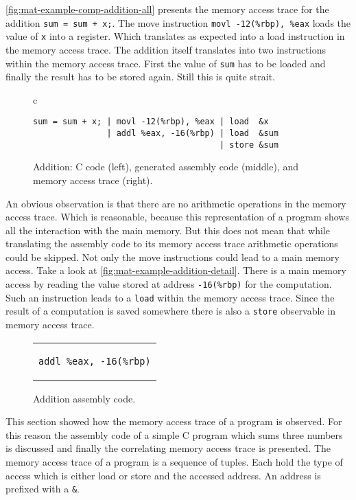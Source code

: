\documentclass[onecolumn, openany, master, english, seal, signatures]{dbrgrptt}
\begin{document}
\autoref{fig:mat-example-comp-addition-all} presents the memory access trace for the addition \texttt{sum = sum + x;}. The move instruction \texttt{movl -12(\%rbp), \%eax} loads the value of \texttt{x} into a register. Which translates as expected into a load instruction in the memory access trace. The addition itself translates into two instructions within the memory access trace. First the value of \texttt{sum} has to be loaded and finally the result has to be stored again. Still this is quite strait.

\begin{figure}[h!]
  \centering
  \begin{tabular}{c}
  \begin{lstlisting}
sum = sum + x; | movl -12(%rbp), %eax | load  &x
               | addl %eax, -16(%rbp) | load  &sum
                                      | store &sum
  \end{lstlisting}
  \end{tabular}
  \caption{Addition: C code (left), generated assembly code (middle), and memory access trace (right).}
  \label{fig:mat-example-comp-addition-all}
\end{figure}

An obvious observation is that there are no arithmetic operations in the memory access trace. Which is reasonable, because this representation of a program shows all the interaction with the main memory. But this does not mean that while translating the assembly code to its memory access trace arithmetic operations could be skipped. Not only the move instructions could lead to a main memory access. Take a look at \autoref{fig:mat-example-addition-detail}. There is a main memory access by reading the value stored at address \texttt{-16(\%rbp)} for the computation. Such an instruction leads to a \texttt{load} within the memory access trace. Since the result of a computation is saved somewhere there is also a \texttt{store} observable in memory access trace.

\begin{figure}[h!]
  \centering
  \begin{tabular}{c}
  \begin{lstlisting}
addl %eax, -16(%rbp)
  \end{lstlisting}
  \end{tabular}
  \caption{Addition assembly code.}
  \label{fig:mat-example-addition-detail}
\end{figure}

This section showed how the memory access trace of a program is observed. For this reason the assembly code of a simple C program which sums three numbers is discussed and finally the correlating memory access trace is presented. The memory access trace of a program is a sequence of tuples. Each hold the type of access which is either load or store and the accessed address. An address is prefixed with a \texttt{&}.
\end{document}
